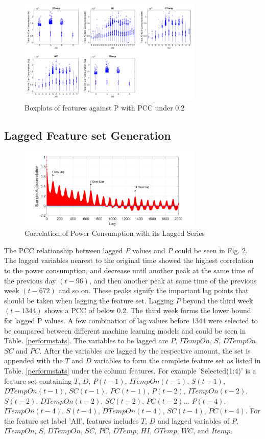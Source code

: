 \documentclass[conference]{IEEEtran}
\begin{document}
\begin{figure}[htb!]\centering \footnotesize\vspace{-1em}
	\includegraphics[width=88mm]{boxplots}
	\caption{Boxplots of features against P with PCC under 0.2}
	\label{boxplot}
\end{figure}

	
\subsection{Lagged Feature set Generation}
\begin{figure}[htb!]\centering \footnotesize\vspace{-2em}
	\includegraphics[width=88mm]{correlationfunctioneditted}
	\caption{Correlation of Power Consumption with its Lagged Series}
	\label{correlationfunction}
\end{figure}
The PCC relationship between lagged \textit{P} values and \textit{P} could be seen in Fig. \ref{correlationfunction}. The lagged variables nearest to the original time showed the highest correlation to the power consumption, and decrease until another peak at the same time of the previous day $(t-96)$, and then another peak at same time of the previous week $(t-672)$ and so on. These peaks signify the important lag points that should be taken when lagging the feature set. Lagging $P$ beyond the third week $(t-1344)$ shows a PCC of below 0.2. The third week forms the lower bound for lagged P values. A few combination of lag values before 1344 were selected to be compared between different machine learning models and could be seen in Table. \ref{performstats}. The variables to be lagged are $P$, $ITempOn$, $S$, $DTempOn$, $SC$ and $PC$. After the variables are lagged by the respective amount, the set is appended with the $T$ and $D$ variables to form the complete feature set as listed in Table. \ref{performstats} under the column features. For example 'Selected(1:4)' is a feature set containing $T$, $D$, $P(t-1)$, $ITempOn(t-1)$, $S(t-1)$, $DTempOn(t-1)$, $SC(t-1)$, $PC(t-1)$, $P(t-2)$, $ITempOn(t-2)$, $S(t-2)$, $DTempOn(t-2)$, $SC(t-2)$, $PC(t-2)$... $P(t-4)$, $ITempOn(t-4)$, $S(t-4)$, $DTempOn(t-4)$, $SC(t-4)$, $PC(t-4)$. For the feature set label 'All', features includes $T$, $D$ and lagged variables of $P$, $ITempOn$, $S$, $DTempOn$, $SC$, $PC$, $DTemp$, $HI$, $OTemp$, $WC$, and $Itemp$.
\end{document}
